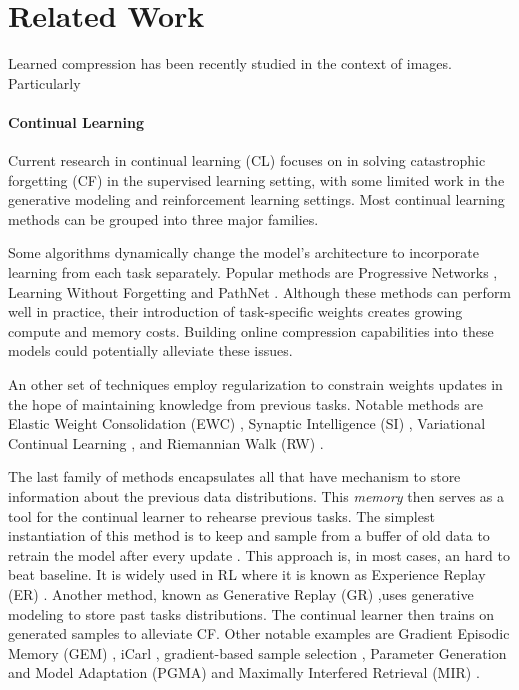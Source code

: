\documentclass[colorinlistoftodos]{article} %
\begin{document}
\section{Related Work}

Learned compression has been recently studied in the context of images. Particularly 

\paragraph{Continual Learning}
Current research in continual learning (CL) focuses on  in solving catastrophic forgetting (CF) in the supervised learning setting, with some limited work in the generative modeling and reinforcement learning settings. Most continual learning methods can be grouped into three major families. 

Some algorithms dynamically change the model’s architecture to incorporate learning from each task separately. Popular methods are Progressive Networks \citep{rusu2016progressive}, Learning Without Forgetting \citep{li2018learning} and PathNet \citep{fernando2017pathnet}. Although these methods can perform well in practice, their introduction of task-specific weights creates growing compute and memory costs. Building online compression capabilities into these models could potentially alleviate these issues.


An other set of techniques employ regularization to constrain weights updates in the hope of maintaining knowledge from previous tasks. Notable methods are Elastic Weight Consolidation (EWC) \citep{kirkpatrick2017overcoming,huszar2017quadratic}, Synaptic Intelligence (SI) \citep{zenke2017continual}, Variational Continual Learning \citep{nguyen2017variational}, and Riemannian Walk (RW) \citep{chaudhry2018riemannian}. 

The last family of methods encapsulates all that have mechanism to store information about the previous data distributions. This \textit{memory} then serves as a tool for the continual learner to rehearse previous tasks. The simplest instantiation of this method is to keep and sample from a buffer of old data to retrain the model after every update \citep{chaudhry2019continual}. This approach is, in most cases, an hard to beat baseline. It is widely used in RL where it is known as Experience Replay (ER) \citep{lin1993reinforcement}. Another method, known as Generative Replay (GR) \citep{shin2017continual},uses generative modeling to store past tasks distributions. The continual learner then trains on generated samples to alleviate CF. Other notable examples are Gradient Episodic Memory (GEM) \citep{lopez2017gradient}, iCarl \citep{rebuffi2017icarl}, gradient-based sample selection \citep{aljundi2018Online}, Parameter Generation and Model Adaptation (PGMA) \citep{hu2018overcoming} and Maximally Interfered Retrieval (MIR) \cite{aljundi2019online}.
\end{document}
